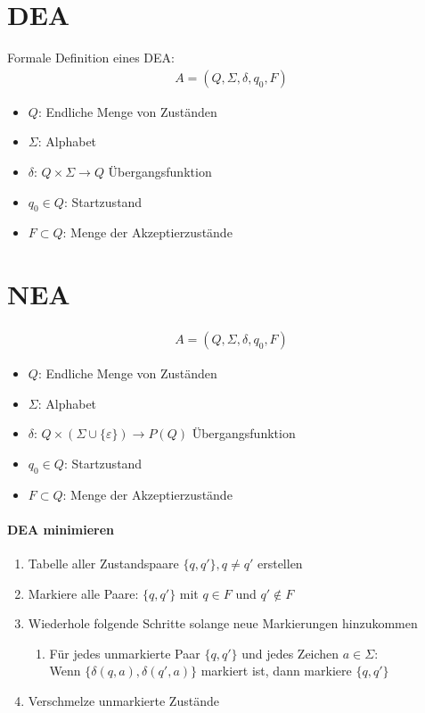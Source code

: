 \section*{DEA}
Formale Definition eines DEA:
\begin{align*}
A = (Q, \Sigma, \delta, q_0, F)
\end{align*}
\begin{itemize}
    \item \(Q\): Endliche Menge von Zuständen
    \item \(\Sigma\): Alphabet
    \item \(\delta\): \(Q \times \Sigma \rightarrow Q\) Übergangsfunktion
    \item \(q_0 \in Q\): Startzustand
    \item \(F \subset Q\): Menge der Akzeptierzustände
\end{itemize}
\section*{NEA}
\begin{align*}
A = (Q, \Sigma, \delta, q_0, F)
\end{align*}
\begin{itemize}
    \item \(Q\): Endliche Menge von Zuständen
    \item \(\Sigma\): Alphabet
    \item \(\delta\): \(Q \times (\Sigma \cup \{\varepsilon\} )\rightarrow P(Q)\) Übergangsfunktion
    \item \(q_0 \in Q\): Startzustand
    \item \(F \subset Q\): Menge der Akzeptierzustände
\end{itemize}
\paragraph{DEA minimieren}
\begin{enumerate}
    \item Tabelle aller Zustandspaare \(\{q, q'\}, q \neq q' \) erstellen
    \item Markiere alle Paare: \(\{q, q'\}\) mit \(q \in F\) und \(q' \notin F\)
    \item Wiederhole folgende Schritte solange neue Markierungen hinzukommen
    \begin{enumerate}[label*=\arabic*.]
        \item Für jedes unmarkierte Paar \(\{q, q'\}\) und jedes Zeichen \(a \in \Sigma\): \\
            Wenn \(\{\delta(q, a), \delta(q',a)\}\) markiert ist, dann markiere \(\{q, q'\}\)
    \end{enumerate}
    \item Verschmelze unmarkierte Zustände
\end{enumerate}
